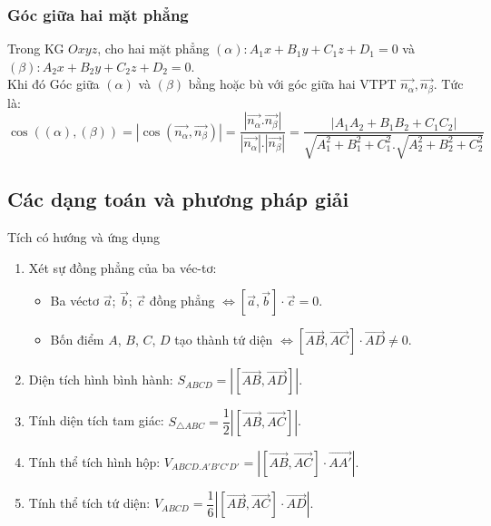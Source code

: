 \begin{tomtat}
\subsubsection{Góc giữa hai mặt phẳng}
Trong KG $Oxyz$, cho hai mặt phẳng $\left(\alpha\right):A_1x+B_1y+C_1z+D_1=0$ và $\left(\beta\right):A_2x+B_2y+C_2z+D_2=0 $.\\
	Khi đó Góc giữa $\left(\alpha\right)$ và $\left(\beta\right)$ bằng hoặc bù với góc giữa hai VTPT $\overrightarrow{n_{\alpha}},\overrightarrow{n_{\beta}}$. Tức là:\\
	$$\boxed{ \cos\left(\left(\alpha\right),\left(\beta\right)\right)=\left|\cos\left(\overrightarrow{n_{\alpha}},\overrightarrow{n_\beta}\right)\right|=\dfrac{\left|\overrightarrow{n_{\alpha}}.\overrightarrow{n_{\beta}}\right|}{\left|\overrightarrow{n_{\alpha}}\right|.\left|\overrightarrow{n_{\beta}}\right|}=\dfrac{\left|A_1A_2+B_1B_2+C_1C_2\right|}{\sqrt{A_1^2+B_1^2+C_1^2}.\sqrt{A_2^2+B_2^2+C_2^2}}}$$
	
\end{tomtat}


\subsection{Các dạng toán và phương pháp giải}
\begin{dang}{Tích có hướng và ứng dụng}
	\begin{enumerate}
		\item Xét sự đồng phẳng của ba véc-tơ:
		\begin{itemize}
			\item Ba véctơ $\vec{a}$; $\vec{b}$; $\vec{c}$ đồng phẳng $\Leftrightarrow \left[ \vec{a},\vec{b} \right]\cdot \vec{c}=0$.
			\item Bốn điểm $A$, $B$, $C$, $D$ tạo thành tứ diện $\Leftrightarrow \left[ \vec{AB},\vec{AC} \right]\cdot \vec{AD}\ne 0$.
		\end{itemize}
		\item Diện tích hình bình hành: $S_{ABCD}=\left| \left[ \vec{AB},\vec{AD} \right] \right|$.
		\item Tính diện tích tam giác: $S_{\triangle ABC}=\dfrac{1}{2}\left| \left[ \vec{AB},\vec{AC} \right] \right|$.
		\item Tính thể tích hình hộp: $V_{ABCD.A'B'C'D'}=\left| \left[ \vec{AB},\vec{AC} \right]\cdot\vec{AA'} \right|$.
		\item Tính thể tích tứ diện: $V_{ABCD}=\dfrac{1}{6}\left| \left[ \vec{AB},\vec{AC} \right]\cdot \vec{AD} \right|$.
	\end{enumerate}
\end{dang}
